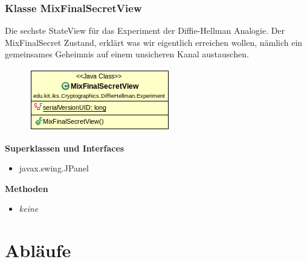 \documentclass{article}
\begin{document}
\subsubsection{Klasse MixFinalSecretView}
      Die sechste StateView für das Experiment der Diffie-Hellman Analogie.
      Der MixFinalSecret Zustand, erklärt was wir eigentlich erreichen wollen,
      nämlich ein gemeinsames Geheimnis auf einem unsicheren Kanal austauschen.

      \begin{figure}[H]
        \centering
        \includegraphics{resources/edu-kit-iks-Cryptographics-DiffieHellman-Experiment-MixFinalSecretView}
      \end{figure}

      \textbf{Superklassen und Interfaces}
      \begin{itemize}
        \item javax.swing.JPanel
      \end{itemize}

      \textbf{Methoden}
      \begin{itemize}
        \item \textit{keine}
      \end{itemize}

\section{Abläufe}

\glsaddall
\printglossary[numberedsection, style=altlist]
\end{document}
